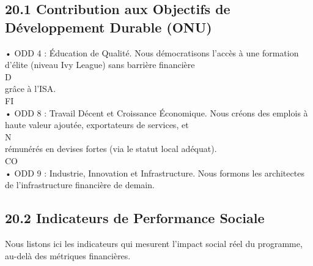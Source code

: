 \documentclass[12pt,landscape,a4paper]{article}
\begin{document}
\subsection{20.1 Contribution aux Objectifs de Développement Durable (ONU)}
• ODD 4 : Éducation de Qualité. Nous démocratisons l’accès à une formation d’élite (niveau Ivy League) sans barrière financière\\
\vspace{0.5em}
\vspace{0.5em}
\vspace{0.5em}
\vspace{0.5em}
D\\
grâce à l’ISA.\\
\vspace{0.5em}
\vspace{0.5em}
\vspace{0.5em}
\vspace{0.5em}
FI\\
• ODD 8 : Travail Décent et Croissance Économique. Nous créons des emplois à haute valeur ajoutée, exportateurs de services, et\\
N\\
rémunérés en devises fortes (via le statut local adéquat).\\
CO\\
• ODD 9 : Industrie, Innovation et Infrastructure. Nous formons les architectes de l’infrastructure financière de demain.\\
\vspace{0.5em}
\vspace{0.5em}
\subsection{20.2 Indicateurs de Performance Sociale}
Nous listons ici les indicateurs qui mesurent l’impact social réel du programme, au-delà des métriques financières.\\
\vspace{0.5em}
\vspace{0.5em}
\end{document}
